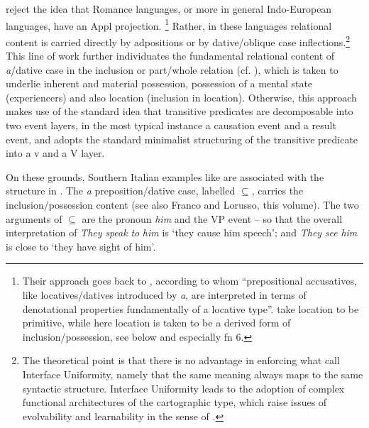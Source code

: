\documentclass[output=paper,colorlinks,citecolor=brown]{./langscibook}
\begin{document}
\citet{ManziniSavoia2010, Manzini2012, ManziniFranco2016} reject the idea that Romance languages, or more in general Indo-European languages, have an Appl projection.{} \footnote{Their approach goes back to \citet[II: 517]{ManziniSavoia2005}, according to whom “prepositional accusatives, like locatives/datives introduced by \textit{a}, are interpreted in terms of denotational properties fundamentally of a locative type”. \citet{ManziniSavoia2005} take location to be primitive, while here location is taken to be a derived form of inclusion/possession, see below and especially fn 6.}   Rather, in these languages relational content is carried directly by adpositions or by dative/oblique case inflections.\footnote{The theoretical point is that there is no advantage in enforcing what \citet{CulicoverJackendoff2005} call Interface Uniformity, namely that the same meaning always maps to the same syntactic structure. Interface Uniformity leads to the adoption of complex functional architectures of the cartographic type, which raise issues of evolvability and learnability in the sense of \citet{ChomskyGallegoOttTA}.} This line of work further individuates the fundamental relational content of \textit{a}/dative case in the inclusion or part/whole relation (cf. \citealt{BelvindenDikken1997}), which is taken to underlie inherent and material possession, possession of a mental state (experiencers) and also location (inclusion in location). Otherwise, this approach makes use of the standard idea that transitive predicates are decomposable into two event layers, in the most typical instance a causation event and a result event, and adopts the standard minimalist structuring of the transitive predicate into a v and a V layer. 

On these grounds, Southern Italian examples like  are associated with the structure in . The \textit{a} preposition/dative case, labelled  ${\subseteq}$, carries the inclusion/possession content (see also Franco and Lorusso, this volume). The two arguments of ${\subseteq}$ are the pronoun \textit{him} and the VP event – so that the overall interpretation of \textit{They} \textit{speak} \textit{to} \textit{him} is ‘they cause him speech’; and \textit{They} \textit{see} \textit{him} is close to ‘they have sight of him’.
\end{document}
